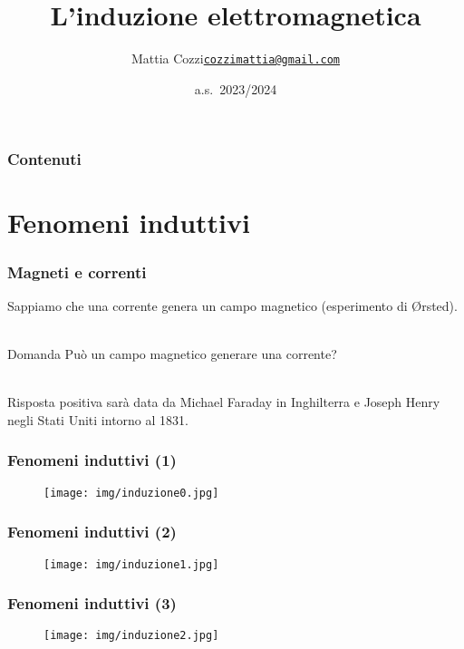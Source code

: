 \documentclass[]{beamer}
\title{L'induzione elettromagnetica}
\author{\texorpdfstring{Mattia Cozzi\newline\href{mailto:cozzimattia@gmail.com}{\texttt{cozzimattia@gmail.com}}}{Mattia Cozzi}}
\date{a.s.~2023/2024}
\theoremstyle{plain}
\begin{document}
\begin{frame}
  \titlepage
\end{frame}





\begin{frame}
\frametitle{Contenuti}
\tableofcontents
\end{frame}


\section{Fenomeni induttivi}

\begin{frame}
  \frametitle{Magneti e correnti}
  Sappiamo che una corrente genera un campo magnetico (esperimento di \O rsted).\\~\\\pause
  \begin{block}{Domanda}
    Può un campo magnetico generare una corrente?
  \end{block}\pause
  ~\\Risposta positiva sarà data da Michael Faraday in Inghilterra e Joseph Henry negli Stati Uniti intorno al 1831.
\end{frame}







\begin{frame}
  \frametitle{Fenomeni induttivi (1)}
\begin{figure}
\texttt{[image: img/induzione0.jpg]}
\end{figure}
\end{frame}

\begin{frame}
  \frametitle{Fenomeni induttivi (2)}
\begin{figure}
\texttt{[image: img/induzione1.jpg]}
\end{figure}
\end{frame}

\begin{frame}
  \frametitle{Fenomeni induttivi (3)}
\begin{figure}
\texttt{[image: img/induzione2.jpg]}
\end{figure}
\end{frame}
\end{document}
